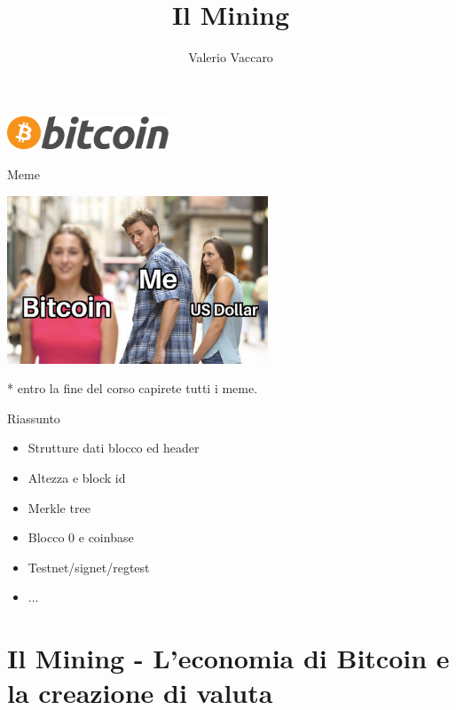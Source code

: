 \documentclass[aspectratio=169]{beamer}
\title{Il Mining}
\author{Valerio Vaccaro}
\date{\displaydate{date}}
\begin{document}
\begin{frame}
    \titlepage
    \begin{center}
        \includegraphics[height=1cm]{logo.png}
    \end{center}
\end{frame}

\begin{frame}[noframenumbering]
    \tableofcontents
\end{frame}

\begin{frame}{Meme}
    \begin{center}
        \includegraphics[height=5cm]{meme_3.png}
    \end{center}
    * entro la fine del corso capirete tutti i meme.
\end{frame}

\begin{frame}{Riassunto}
    \begin{itemize}
        \item Strutture dati blocco ed header
        \item Altezza e block id
        \item Merkle tree
        \item Blocco 0 e coinbase
        \item Testnet/signet/regtest
        \item ...
    \end{itemize}
\end{frame}

\section{Il Mining - L’economia di Bitcoin e la creazione di valuta}
\end{document}
